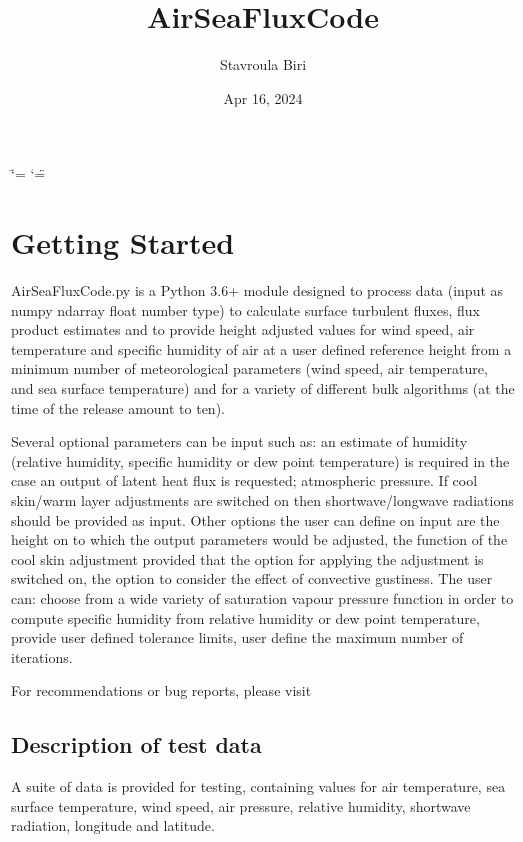 \documentclass[letterpaper,10pt,english]{sphinxmanual}
\title{AirSeaFluxCode}
\date{Apr 16, 2024}
\author{Stavroula Biri}
\begin{document}
\ifdefined\shorthandoff
  \ifnum\catcode`\=\string=\active\shorthandoff{=}\fi
  \ifnum\catcode`\"=\active{}\fi
\fi

\pagestyle{empty}
\sphinxmaketitle
\pagestyle{plain}
\sphinxtableofcontents
\pagestyle{normal}
\label{\detokenize{index::doc}}


\sphinxstepscope


\chapter{Getting Started}
\label{\detokenize{getting_started:getting-started}}\label{\detokenize{getting_started::doc}}
\sphinxAtStartPar
AirSeaFluxCode.py is a Python 3.6+ module designed to process data (input as numpy ndarray float number type) to calculate surface turbulent fluxes, flux product estimates and to provide height adjusted values for wind speed, air temperature and specific humidity of air at a user defined reference height from a minimum number of meteorological parameters (wind speed, air temperature, and sea surface temperature) and for a variety of different bulk algorithms (at the time of the release amount to ten).

\sphinxAtStartPar
Several optional parameters can be input such as: an estimate of humidity (relative humidity, specific humidity or dew point temperature) is required in the case an output of latent heat flux is requested; atmospheric pressure. If cool skin/warm layer adjustments are switched on then shortwave/longwave radiations should be provided as input. Other options the user can define on input are the height on to which the output parameters would be adjusted, the function of the cool skin adjustment provided that the option for applying the adjustment is switched on, the option to consider the effect of convective gustiness. The user can: choose from a wide variety of saturation vapour pressure function in order to compute specific humidity from relative humidity or dew point temperature, provide user defined tolerance limits, user define the maximum number of iterations.

\sphinxAtStartPar
For recommendations or bug reports, please visit 


\section{Description of test data}
\label{\detokenize{getting_started:description-of-test-data}}
\sphinxAtStartPar
A suite of data is provided for testing, containing values for air temperature, sea surface temperature, wind speed, air pressure, relative humidity, shortwave radiation, longitude and latitude.
\end{document}
